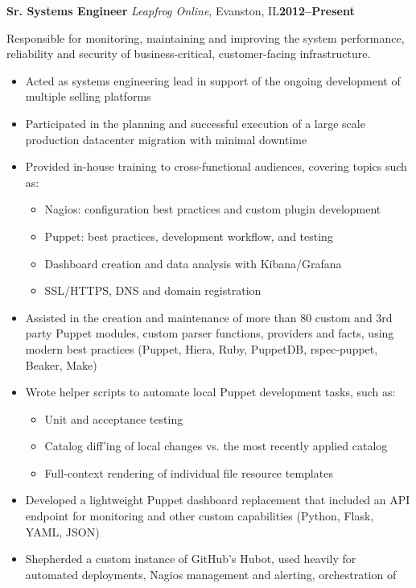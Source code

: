 \documentclass[11pt,letterpaper]{article}
\newcommand{\cventry}[5]{%
{\bfseries{#2}} {\small{\textit{#3}, #4}}\hfill {\small\bfseries{#1}}
\begin{adjustwidth}{1em}{2em}{\raggedright{#5}}\end{adjustwidth}
}
\begin{document}
\cventry{2012--Present}{Sr. Systems Engineer}{Leapfrog Online}{Evanston, IL}{%
{Responsible for monitoring, maintaining and improving the system performance,
reliability and security of business-critical, customer-facing infrastructure.}

\begin{small}
\begin{itemize}
\item Acted as systems engineering lead in support of the ongoing
      development of multiple selling platforms
\item Participated in the planning and successful execution of a large scale
      production datacenter migration with minimal downtime
\item Provided in-house training to cross-functional audiences, covering
      topics such as:
\begin{itemize}
  \item Nagios: configuration best practices and custom plugin development
  \item Puppet: best practices, development workflow, and testing
  \item Dashboard creation and data analysis with Kibana/Grafana
  \item SSL/HTTPS, DNS and domain registration
\end{itemize}
\item Assisted in the creation and maintenance of more than 80 custom and 3rd
      party Puppet modules, custom parser functions, providers and facts, using
      modern best practices (Puppet, Hiera, Ruby, PuppetDB, rspec-puppet,
      Beaker, Make)
\item Wrote helper scripts to automate local Puppet development tasks, such as:
  \begin{itemize}
    \item Unit and acceptance testing
    \item Catalog diff'ing of local changes vs. the most recently applied catalog
    \item Full-context rendering of individual file resource templates
  \end{itemize}
\item Developed a lightweight Puppet dashboard replacement that included an
      API endpoint for monitoring and other custom capabilities (Python,
      Flask, YAML, JSON)
\item Shepherded a custom instance of GitHub's Hubot, used heavily for
      automated deployments, Nagios management and alerting, orchestration of

\end{itemize}
\end{small}}
\end{document}
